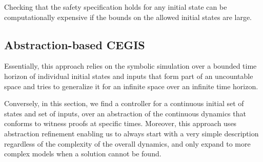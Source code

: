\documentclass[twocolumn]{autart}    %
\begin{document}
Checking that the safety specification holds for any initial state can be
computationally expensive if the bounds on the allowed initial states are
large.

\subsection{Abstraction-based CEGIS} 
\label{sssec:abstraction}



Essentially, this approach relies on the symbolic simulation over a bounded
time horizon of individual initial states and inputs that form part of an
uncountable space and tries to generalize it for an infinite space over an
infinite time horizon.





Conversely, in this section, we find a controller for a continuous initial
set of states and set of inputs, over an abstraction of the continuous
dynamics \cite{cattaruzza2015unbounded} that conforms to witness proofs at
specific times.  %
Moreover, this approach uses abstraction refinement enabling us to always
start with a very simple description regardless of the complexity of the
overall dynamics, and only expand to more complex models when a solution
cannot be found.
\end{document}
